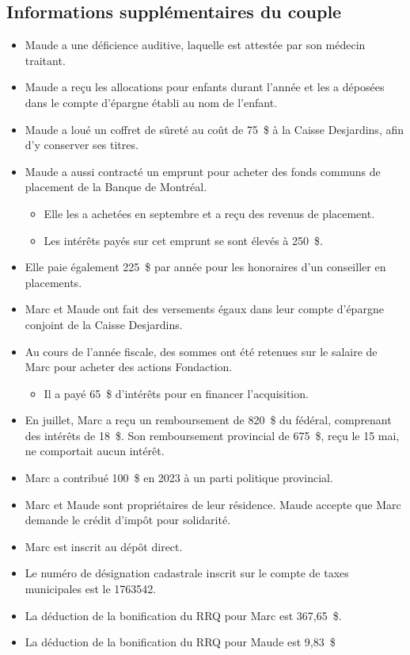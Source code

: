 \subsection{Informations supplémentaires du couple}
\begin{itemize}
	\item Maude a une déficience auditive, laquelle est attestée par son médecin traitant.
	\item Maude a reçu les allocations pour enfants durant l'année et les a déposées dans le compte d'épargne établi au nom de l'enfant.
	\item Maude a loué un coffret de sûreté au coût de 75~\$ à la Caisse Desjardins, afin d'y conserver ses titres.
	\item Maude a aussi contracté un emprunt pour acheter des fonds communs de placement de la Banque de Montréal.
	\begin{itemize}
		\item Elle les a achetées en septembre et a reçu des revenus de placement.
		\item Les intérêts payés sur cet emprunt se sont élevés à 250~\$.
	\end{itemize}
	\item Elle paie également 225~\$ par année pour les honoraires d'un conseiller en placements.
	\item Marc et Maude ont fait des versements égaux dans leur compte d'épargne conjoint de la Caisse Desjardins.
	\item Au cours de l'année fiscale, des sommes ont été retenues sur le salaire de Marc pour acheter des actions Fondaction.
	\begin{itemize}
		\item Il a payé 65~\$ d'intérêts pour en financer l'acquisition.
	\end{itemize}
	\item En juillet, Marc a reçu un remboursement de 820~\$ du fédéral, comprenant des intérêts de 18~\$. Son remboursement provincial de 675~\$, reçu le 15 mai, ne comportait aucun intérêt.
	\item Marc a contribué 100~\$ en 2023 à un parti politique provincial.
	\item Marc et Maude sont propriétaires de leur résidence. Maude accepte que Marc demande le crédit d'impôt pour solidarité.
	\item Marc est inscrit au dépôt direct.
	\item Le numéro de désignation cadastrale inscrit sur le compte de taxes municipales est le 1763542.
	\item La déduction de la bonification du RRQ pour Marc est 367,65~\$.
	\item La déduction de la bonification du RRQ pour Maude est 9,83~\$
\end{itemize}

